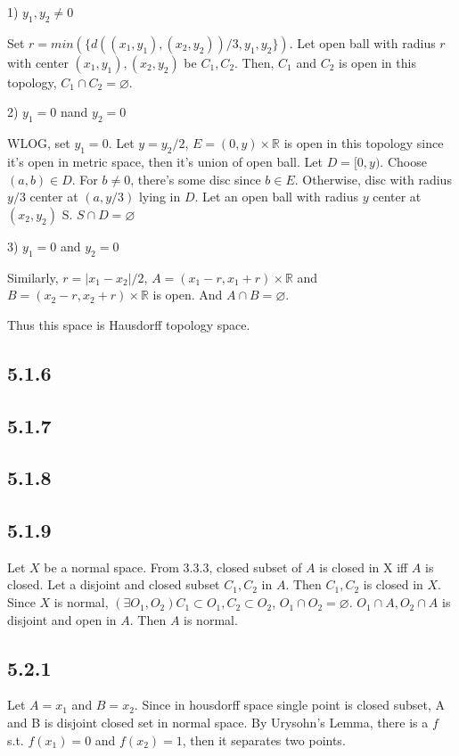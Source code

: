 \documentclass{article}
\let\emptyset\varnothing
\begin{document}
1) $y_1,y_2\neq 0$

Set $r=min(\{d((x_1, y_1), (x_2, y_2))/3, y_1, y_2\})$. Let open ball with radius $r$ with center $(x_1, y_1), (x_2, y_2)$ be $C_1, C_2$. Then, $C_1$ and $C_2$ is open in this topology, $C_1 \cap C_2=\emptyset$.

2) $y_1=0$ nand $y_2=0$

WLOG, set $y_1=0$. Let $y=y_2/2$, $E=(0, y)\times \mathbb{R}$ is open in this topology since it's open in metric space, then it's union of open ball. Let $D=[0, y)$. Choose $(a,b)\in D$. For $b\neq0$, there's some disc since $b\in E$. Otherwise, disc with radius $y/3$ center at $(a,y/3)$ lying in $D$. Let an open ball with radius $y$ center at $(x_2, y_2)$ S. $S \cap D = \emptyset$

3) $y_1=0$ and $y_2=0$

Similarly, $r=|x_1-x_2|/2$, $A=(x_1-r, x_1+r)\times \mathbb{R}$ and $B=(x_2-r, x_2+r) \times \mathbb{R}$ is open. And $A \cap B = \emptyset$.

Thus this space is Hausdorff topology space.

\subsection*{5.1.6}
\subsection*{5.1.7}
\subsection*{5.1.8}
\subsection*{5.1.9}

Let $X$ be a normal space. From 3.3.3, closed subset of $A$ is closed in X iff $A$ is closed. Let a disjoint and closed subset $C_1, C_2$ in $A$. Then $C_1, C_2$ is closed in $X$. Since $X$ is normal, $(\exists O_1, O_2) C_1 \subset O_1, C_2 \subset O_2$, $O_1\cap O_2 = \emptyset$. $O_1 \cap A, O_2 \cap A$ is disjoint and open in $A$. Then $A$ is normal.

\subsection*{5.2.1}

Let $A={x_1}$ and $B={x_2}$. Since in housdorff space single point is closed subset, A and B is disjoint closed set in normal space. By Urysohn's Lemma, there is a $f$ s.t. $f(x_1)=0$ and $f(x_2)=1$, then it separates two points.
\end{document}
